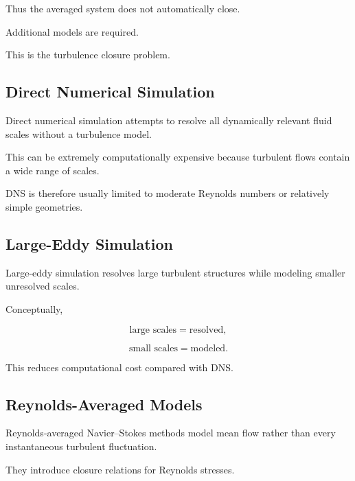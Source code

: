 Thus the averaged system does not automatically close.

Additional models are required.

This is the turbulence closure problem.

\subsection{Direct Numerical Simulation}
\label{subsec:direct-numerical-simulation}

Direct numerical simulation attempts to resolve all dynamically relevant
fluid scales without a turbulence model.

This can be extremely computationally expensive because turbulent flows
contain a wide range of scales.

DNS is therefore usually limited to moderate Reynolds numbers or relatively
simple geometries.

\subsection{Large-Eddy Simulation}
\label{subsec:large-eddy-simulation}

Large-eddy simulation resolves large turbulent structures while modeling
smaller unresolved scales.

Conceptually,

\[
\boxed{
\text{large scales}
=
\text{resolved},
}
\]

\[
\boxed{
\text{small scales}
=
\text{modeled}.
}
\]

This reduces computational cost compared with DNS.

\subsection{Reynolds-Averaged Models}
\label{subsec:reynolds-averaged-models}

Reynolds-averaged Navier--Stokes methods model mean flow rather than every
instantaneous turbulent fluctuation.

They introduce closure relations for Reynolds stresses.

